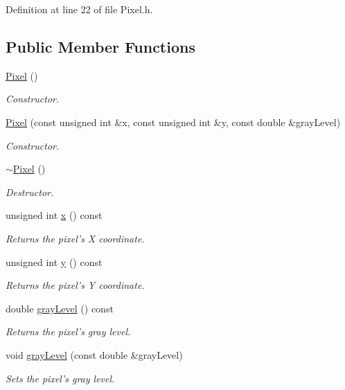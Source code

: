 Definition at line 22 of file Pixel.h.\subsection*{Public Member Functions}
\begin{CompactItemize}
\item 
\hyperlink{class_pixel_27ad99a2f705e635c42d242d530d4756}{Pixel} ()
\begin{CompactList}\small\item\em Constructor. \item\end{CompactList}\item 
\hyperlink{class_pixel_e54d95bf19847e4857eeb03f1138ceb9}{Pixel} (const unsigned int \&x, const unsigned int \&y, const double \&grayLevel)
\begin{CompactList}\small\item\em Constructor. \item\end{CompactList}\item 
\hyperlink{class_pixel_30f6aaf9a1d8792245070860546fa365}{$\sim$Pixel} ()
\begin{CompactList}\small\item\em Destructor. \item\end{CompactList}\item 
unsigned int \hyperlink{class_pixel_68dafccc4588fb33d445641c2766316b}{x} () const 
\begin{CompactList}\small\item\em Returns the pixel's X coordinate. \item\end{CompactList}\item 
unsigned int \hyperlink{class_pixel_204cc91a99e1e4f1d96c9cf6caf5747a}{y} () const 
\begin{CompactList}\small\item\em Returns the pixel's Y coordinate. \item\end{CompactList}\item 
double \hyperlink{class_pixel_6e445cee8bfa4475238823e0b6da42b0}{grayLevel} () const 
\begin{CompactList}\small\item\em Returns the pixel's gray level. \item\end{CompactList}\item 
void \hyperlink{class_pixel_5f287c6a53167076bc8f1ce54e74e38d}{grayLevel} (const double \&grayLevel)
\begin{CompactList}\small\item\em Sets the pixel's gray level. \item\end{CompactList}\end{CompactItemize}
